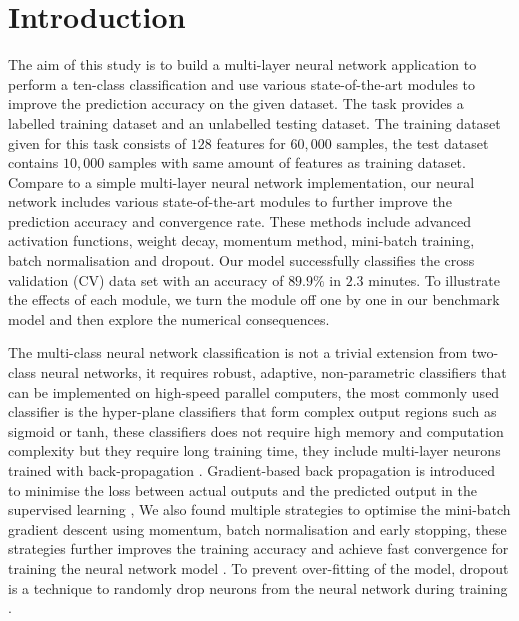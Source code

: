 \section{Introduction\label{chapter1}}

The aim of this study is to build a multi-layer neural network application to perform a ten-class classification and use various state-of-the-art modules to improve the prediction accuracy on the given dataset.
The task provides a labelled training dataset and an unlabelled testing dataset.
The training dataset given for this task consists of $128$ features for $60,000$ samples,
the test dataset contains $10,000$ samples with same amount of features as training dataset.
Compare to a simple multi-layer neural network implementation,%
our neural network includes various state-of-the-art modules to further improve the prediction accuracy and convergence rate. These methods include advanced activation functions, 
weight decay, 
momentum method,
mini-batch training, batch normalisation and dropout. 
Our model successfully classifies the cross validation (CV) data set with an accuracy of $89.9\%$ in $2.3$ minutes. 
To illustrate the effects of each module, we turn the module off one by one in our benchmark model and then explore the numerical consequences.

The multi-class neural network classification is not a trivial extension from two-class neural networks,
it requires robust, adaptive, non-parametric classifiers that can be implemented on high-speed parallel computers,
the most commonly used classifier is the hyper-plane classifiers that form complex output regions such as sigmoid or tanh,
these classifiers does not require high memory and computation complexity but they require long training time,
they include multi-layer neurons trained with back-propagation \citet{werbos1990backpropagation}.
Gradient-based back propagation is introduced to minimise the loss between actual outputs and the predicted output in the supervised learning \citet{lecun1998Gradient},
We also found multiple strategies to optimise the mini-batch gradient descent using momentum, batch normalisation and early stopping,
these strategies further improves the training accuracy and achieve fast convergence for training the neural network model \citet{ruder2016overview}.
To prevent over-fitting of the model, dropout is a technique to randomly drop neurons from the neural network during training \citet{dropout}.

